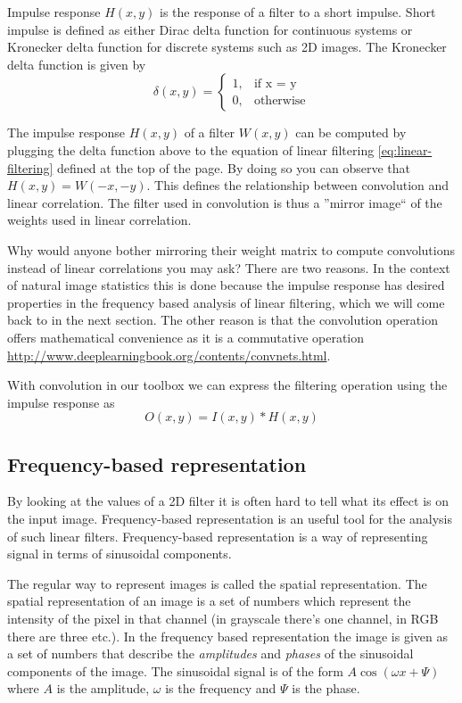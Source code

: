 \documentclass[]{article}
\begin{document}
Impulse response $H(x,y)$ is the response of a filter to a short impulse. Short
impulse is defined as either Dirac delta function for continuous systems or
Kronecker delta function for discrete systems such as 2D images. The Kronecker
delta function is given by
\begin{equation}
  \delta(x,y) = \begin{cases}
    1, & \text{if x = y}\\
    0, & \text{otherwise}
  \end{cases}
\end{equation}

The impulse response $H(x,y)$ of a filter $W(x,y)$ can be computed by plugging
the delta function above to the equation of linear filtering
\ref{eq:linear-filtering} defined at the top of the page. By doing so you can
observe that $H(x,y) = W(-x,-y)$. This defines the relationship between
convolution and linear correlation. The filter used in convolution is thus a
''mirror image`` of the weights used in linear correlation.

Why would anyone bother mirroring their weight matrix to compute convolutions
instead of linear correlations you may ask? There are two reasons. In the
context of natural image statistics this is done because the impulse response
has desired properties in the frequency based analysis of linear filtering,
which we will come back to in the next section. The other reason is that the
convolution operation offers mathematical convenience as it is a commutative
operation \url{http://www.deeplearningbook.org/contents/convnets.html}.

With convolution in our toolbox we can express the filtering operation using
the impulse response as
\begin{equation}
  O(x,y) = I(x,y) \ast H(x,y)
\end{equation}

\subsection{Frequency-based representation}
\label{frequency-based-representation}
By looking at the values of a 2D filter it is often hard to tell what its
effect is on the input image. Frequency-based representation is an useful tool
for the analysis of such linear filters. Frequency-based representation is a
way of representing signal in terms of sinusoidal components.

The regular way to represent images is called the spatial representation. The
spatial representation of an image is a set of numbers which represent the
intensity of the pixel in that channel (in grayscale there's one channel, in
RGB there are three etc.). In the frequency based representation the image is
given as a set of numbers that describe the \textit{amplitudes} and
\textit{phases} of the sinusoidal components of the image. The sinusoidal
signal is of the form $A \cos(\omega x + \Psi)$ where $A$ is the amplitude,
$\omega$ is the frequency and $\Psi$ is the phase.
\end{document}
